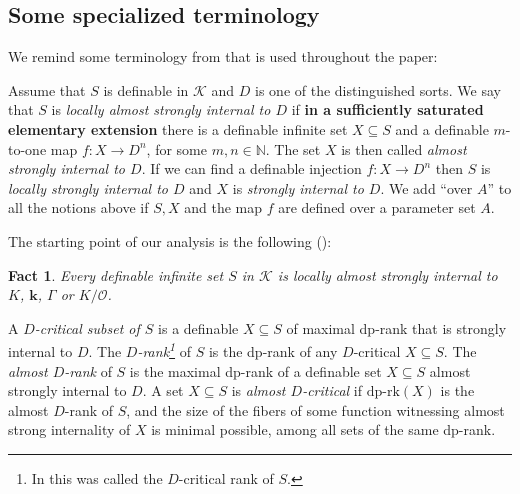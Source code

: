 \documentclass[11pt]{amsart}
\newtheorem{fact}[theorem]{Fact}
\theoremstyle{definition}
\newcommand{\Nn}{{\mathbb{N}}}
\newcommand{\bk}{\textbf{k}}
\newcommand{\CK}{{\mathcal K}}
\newcommand{\CO}{{\mathcal O}}
\newcommand{\0}{\emptyset}
\def\dpr{\mathrm{dp\text{-}rk}}
\def\sub{\subseteq}
\begin{document}
\subsection{Some specialized terminology} 
 We remind some terminology from \cite{HaHaPeGps} that is used throughout the paper: 

Assume that  $S$ is definable in $\CK$ and $D$ is one of the distinguished sorts. We say that $S$ is \emph{locally almost strongly internal to $D$} if {\bf in a sufficiently saturated elementary extension}
  there is a definable infinite set $X\sub S$ and a definable $m$-to-one map $f: X\to D^n$, for some $m,n\in \Nn$. The set $X$ is then called \emph{almost strongly internal to $D$}. If we can find a definable injection $f:X\to D^n$ then $S$ is \emph{locally strongly internal to $D$} and $X$ is \emph{strongly internal to $D$}.  We add ``over $A$'' to all the notions above if $S,X$ and the map $f$ are defined over a parameter set $A$.

  The starting point of our analysis is the following (\cite[Lemma 7.3, Lemma 7.6, Lemma 7.10]{HaHaPeGps}):
  \begin{fact}\label{F: Reduction to sorts}
   Every definable infinite set $S$ in $\CK$ is locally almost strongly internal to $K$, $\bk$, $\Gamma$ or $K/\CO$.    
  \end{fact}

 
A {\em $D$-critical subset of $S$} is a definable $X\sub S$ of maximal dp-rank that is strongly internal to $D$.  The \emph{$D$-rank\footnote{In \cite{HaHaPeGps} this was called the $D$-critical rank of $S$.}} of $S$ is the dp-rank of any $D$-critical $X\sub S$. The \emph{almost $D$-rank} of $S$ is the maximal dp-rank of a definable set $X\sub S$ almost strongly internal to $D$. A set $X\sub S$ is \emph{almost $D$-critical} if $\dpr(X)$ is the almost $D$-rank of $S$, and the size of the fibers of some function witnessing almost strong internality of $X$ is minimal possible, among all sets of the same dp-rank. 



\end{document}
